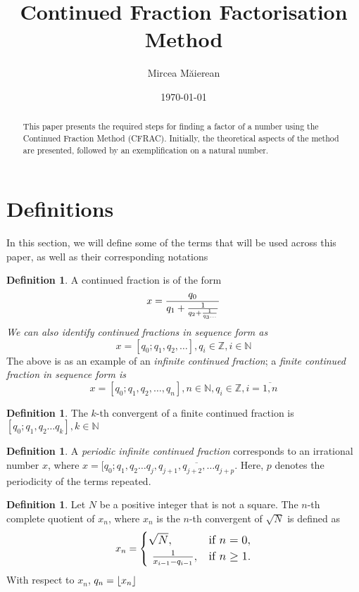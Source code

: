 \documentclass[12pt]{article}
\title{Continued Fraction Factorisation Method}
\author{Mircea Măierean}
\date{\today}
\DeclarePairedDelimiter\floor{\lfloor}{\rfloor}
\theoremstyle{definition}
\newtheorem{definition}[theorem]{Definition}
\begin{document}
\maketitle

\begin{abstract}
This paper presents the required steps for finding a factor of a number using the Continued Fraction Method (CFRAC). Initially, the theoretical aspects of the method are presented, followed by an exemplification on a natural number.
\end{abstract}

\tableofcontents


\section{Definitions}
In this section, we will define some of the terms that will be used across this paper, as well as their corresponding notations
\begin{definition}
A continued fraction is of the form
\begin{equation}%
\large %
x = \frac{q_0}{q_1 + \frac{1}{q_2 + \frac{1}{q_3 \dots}}}%
\end{equation}
\textit{We can also identify continued fractions in sequence form as 
\[ x = [q_0; q_1, q_2, \ldots], q_i \in \mathbb{Z}, i \in \mathbb{N} \]
}
The above is as an example of an \textit{infinite continued fraction}; a \textit{finite continued fraction in sequence form is \[ x = [q_0; q_1, q_2, \ldots,q_n], n \in \mathbb{N}, q_i \in \mathbb{Z}, i = \overline{1, n}
\]
}
\end{definition}

\begin{definition}
    The $k$-th convergent of a finite continued fraction is $[q_0; q_1, q_2 \ldots q_k], k\in \mathbb{N}$
\end{definition}

\begin{definition}
    A \textit{periodic infinite continued fraction} corresponds to an irrational number $x$, where $x = [q_0; q_1, q_2 \ldots q_j, \overline{q_{j + 1}, q_{j + 2}, \ldots q_{j + p}}$. Here, $p$ denotes the periodicity of the terms repeated. 
\end{definition}

\begin{definition}
    Let $N$ be a positive integer that is not a square. The $n$-th complete quotient of $x_n$, where $x_n$ is the $n$-th convergent of $\sqrt{N}$ is defined as
\begin{equation}
\large
x_n = \begin{cases} 
\sqrt{N}, &\text{if } n = 0, \\\
\frac{1}{x_{i-1} - q_{i-1}}, &\text{if } n \geq 1.
\end{cases}
\end{equation}
With respect to $x_n$, $q_n=\floor{x_n}$
\end{definition}
\end{document}
